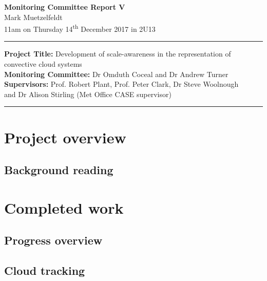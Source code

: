 \documentclass[11pt,a4paper]{article}
\newcommand{\ts}{\textsuperscript}
\begin{document}

\begin{center}
    \Large{\textbf{Monitoring Committee Report V}}\\[0.1cm]
    \large{Mark Muetzelfeldt}\\
    \normalsize{11am on Thursday 14\ts{th} December 2017 in 2U13}\\[0.1cm]		
    \rule{\textwidth}{0.2mm}
    \textbf{Project Title: }Development of scale-awareness in the representation of
    convective cloud systems\\
    \textbf{Monitoring Committee: }Dr Omduth Coceal and  Dr Andrew Turner\\
    \textbf{Supervisors: }Prof. Robert Plant, Prof. Peter Clark, Dr Steve Woolnough \\
    and Dr Alison Stirling (Met Office CASE supervisor)\\
    \rule{\textwidth}{0.2mm}
\end{center}

\section{Project overview}
\label{sec:Project Overview}

\subsection{Background reading}
\label{sec:Background reading}


\section{Completed work}
\label{sec:Completed work}

\subsection{Progress overview}
\label{sec:Progress overview}

\subsection{Cloud tracking}
\label{sec:Cloud tracking}
\end{document}
